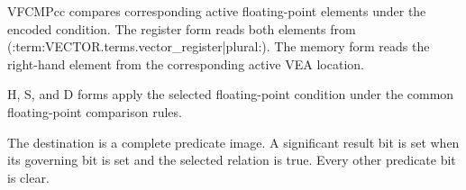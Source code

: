 VFCMPcc compares corresponding active floating-point elements under the encoded
condition.
The register form reads both elements from (:term:VECTOR.terms.vector_register|plural:). The memory form
reads the right-hand element from the corresponding active VEA location.

H, S, and D forms apply the selected floating-point condition under the common
floating-point comparison rules.

The destination is a complete predicate image. A significant result bit is
set when its governing bit is set and the selected relation is true. Every
other predicate bit is clear.
